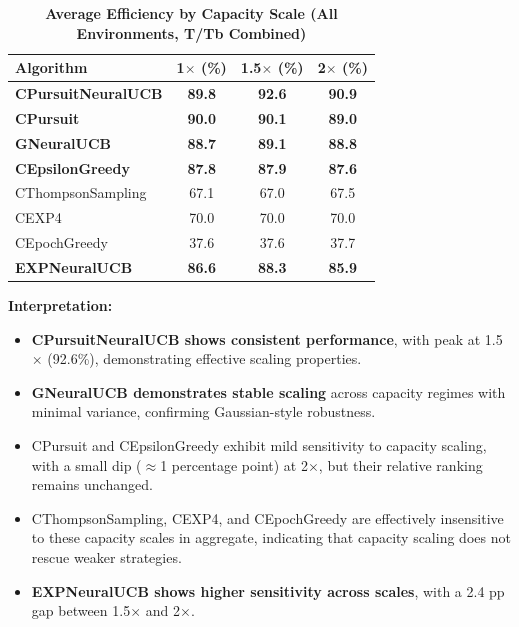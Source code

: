 \documentclass[12pt,a4paper]{article}
\newcommand{\performance}[1]{\textcolor{performancecolor}{\textbf{#1}}}
\newcommand{\legacy}[1]{\textcolor{legacycolor}{\textbf{#1}}}
\newcommand{\neural}[1]{\textcolor{neuralcolor}{\textbf{#1}}}
\begin{document}
\begin{table}[H]
\centering
\caption{\performance{Average Efficiency by Capacity Scale (All Environments, T/Tb Combined)}}
\begin{tabular}{|l|c|c|c|}
\hline
\textbf{Algorithm} & \textbf{1$\times$ (\%)} & \textbf{1.5$\times$ (\%)} & \textbf{2$\times$ (\%)} \\
\hline
\hline
\neural{CPursuitNeuralUCB}   & \neural{89.8}     & \neural{92.6}     & \neural{90.9} \\
\performance{CPursuit}        & \performance{90.0} & \performance{90.1} & \performance{89.0} \\
\neural{GNeuralUCB}          & \neural{88.7}     & \neural{89.1}     & \neural{88.8} \\
\performance{CEpsilonGreedy} & \performance{87.8} & \performance{87.9} & \performance{87.6} \\
CThompsonSampling            & 67.1              & 67.0              & 67.5 \\
CEXP4                        & 70.0              & 70.0              & 70.0 \\
CEpochGreedy                 & 37.6              & 37.6              & 37.7 \\
\legacy{EXPNeuralUCB}        & \legacy{86.6}     & \legacy{88.3}     & \legacy{85.9} \\
\hline
\end{tabular}
\end{table}

\textbf{Interpretation:}
\begin{itemize}
\item \neural{CPursuitNeuralUCB shows consistent performance}, with peak at 1.5$\times$ (92.6\%), demonstrating effective scaling properties.
\item \neural{GNeuralUCB demonstrates stable scaling} across capacity regimes with minimal variance, confirming Gaussian-style robustness.
\item CPursuit and CEpsilonGreedy exhibit mild sensitivity to capacity scaling, with a small dip ($\approx$1 percentage point) at 2$\times$, but their relative ranking remains unchanged.
\item CThompsonSampling, CEXP4, and CEpochGreedy are effectively insensitive to these capacity scales in aggregate, indicating that capacity scaling does not rescue weaker strategies.
\item \legacy{EXPNeuralUCB shows higher sensitivity across scales}, with a 2.4 pp gap between 1.5$\times$ and 2$\times$.
\end{itemize}
\end{document}
